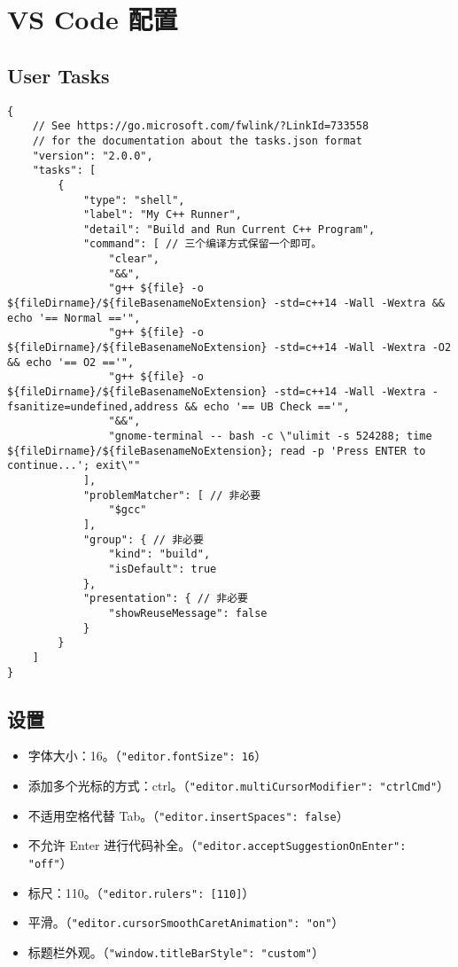 \section{VS Code 配置}

\subsection{User Tasks}

\begin{verbatim}
{
    // See https://go.microsoft.com/fwlink/?LinkId=733558
    // for the documentation about the tasks.json format
    "version": "2.0.0",
    "tasks": [
        {
            "type": "shell",
            "label": "My C++ Runner",
            "detail": "Build and Run Current C++ Program",
            "command": [ // 三个编译方式保留一个即可。
                "clear",
                "&&",
                "g++ ${file} -o ${fileDirname}/${fileBasenameNoExtension} -std=c++14 -Wall -Wextra && echo '== Normal =='",
                "g++ ${file} -o ${fileDirname}/${fileBasenameNoExtension} -std=c++14 -Wall -Wextra -O2 && echo '== O2 =='",
                "g++ ${file} -o ${fileDirname}/${fileBasenameNoExtension} -std=c++14 -Wall -Wextra -fsanitize=undefined,address && echo '== UB Check =='",
                "&&",
                "gnome-terminal -- bash -c \"ulimit -s 524288; time ${fileDirname}/${fileBasenameNoExtension}; read -p 'Press ENTER to continue...'; exit\""
            ],
            "problemMatcher": [ // 非必要
                "$gcc"
            ],
            "group": { // 非必要
                "kind": "build",
                "isDefault": true
            },
            "presentation": { // 非必要
                "showReuseMessage": false
            }
        }
    ]
}
\end{verbatim}

\subsection{设置}

\begin{itemize}
    \item 字体大小：16。（\lstinline|"editor.fontSize": 16|）
    \item 添加多个光标的方式：ctrl。（\lstinline|"editor.multiCursorModifier": "ctrlCmd"|）
    \item 不适用空格代替 Tab。（\lstinline|"editor.insertSpaces": false|）
    \item 不允许 Enter 进行代码补全。（\lstinline|"editor.acceptSuggestionOnEnter": "off"|）
    \item 标尺：110。（\lstinline|"editor.rulers": [110]|）
    \item 平滑。（\lstinline|"editor.cursorSmoothCaretAnimation": "on"|）
    \item 标题栏外观。（\lstinline|"window.titleBarStyle": "custom"|）
\end{itemize}

